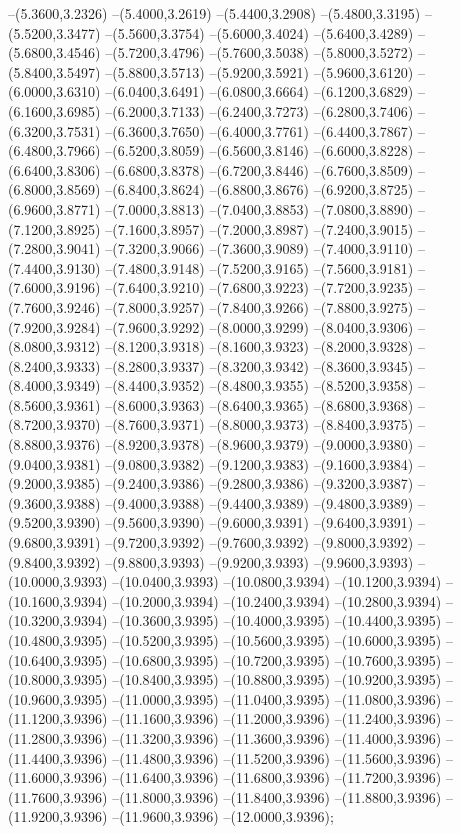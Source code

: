 {	--(5.3600,3.2326)
	--(5.4000,3.2619)
	--(5.4400,3.2908)
	--(5.4800,3.3195)
	--(5.5200,3.3477)
	--(5.5600,3.3754)
	--(5.6000,3.4024)
	--(5.6400,3.4289)
	--(5.6800,3.4546)
	--(5.7200,3.4796)
	--(5.7600,3.5038)
	--(5.8000,3.5272)
	--(5.8400,3.5497)
	--(5.8800,3.5713)
	--(5.9200,3.5921)
	--(5.9600,3.6120)
	--(6.0000,3.6310)
	--(6.0400,3.6491)
	--(6.0800,3.6664)
	--(6.1200,3.6829)
	--(6.1600,3.6985)
	--(6.2000,3.7133)
	--(6.2400,3.7273)
	--(6.2800,3.7406)
	--(6.3200,3.7531)
	--(6.3600,3.7650)
	--(6.4000,3.7761)
	--(6.4400,3.7867)
	--(6.4800,3.7966)
	--(6.5200,3.8059)
	--(6.5600,3.8146)
	--(6.6000,3.8228)
	--(6.6400,3.8306)
	--(6.6800,3.8378)
	--(6.7200,3.8446)
	--(6.7600,3.8509)
	--(6.8000,3.8569)
	--(6.8400,3.8624)
	--(6.8800,3.8676)
	--(6.9200,3.8725)
	--(6.9600,3.8771)
	--(7.0000,3.8813)
	--(7.0400,3.8853)
	--(7.0800,3.8890)
	--(7.1200,3.8925)
	--(7.1600,3.8957)
	--(7.2000,3.8987)
	--(7.2400,3.9015)
	--(7.2800,3.9041)
	--(7.3200,3.9066)
	--(7.3600,3.9089)
	--(7.4000,3.9110)
	--(7.4400,3.9130)
	--(7.4800,3.9148)
	--(7.5200,3.9165)
	--(7.5600,3.9181)
	--(7.6000,3.9196)
	--(7.6400,3.9210)
	--(7.6800,3.9223)
	--(7.7200,3.9235)
	--(7.7600,3.9246)
	--(7.8000,3.9257)
	--(7.8400,3.9266)
	--(7.8800,3.9275)
	--(7.9200,3.9284)
	--(7.9600,3.9292)
	--(8.0000,3.9299)
	--(8.0400,3.9306)
	--(8.0800,3.9312)
	--(8.1200,3.9318)
	--(8.1600,3.9323)
	--(8.2000,3.9328)
	--(8.2400,3.9333)
	--(8.2800,3.9337)
	--(8.3200,3.9342)
	--(8.3600,3.9345)
	--(8.4000,3.9349)
	--(8.4400,3.9352)
	--(8.4800,3.9355)
	--(8.5200,3.9358)
	--(8.5600,3.9361)
	--(8.6000,3.9363)
	--(8.6400,3.9365)
	--(8.6800,3.9368)
	--(8.7200,3.9370)
	--(8.7600,3.9371)
	--(8.8000,3.9373)
	--(8.8400,3.9375)
	--(8.8800,3.9376)
	--(8.9200,3.9378)
	--(8.9600,3.9379)
	--(9.0000,3.9380)
	--(9.0400,3.9381)
	--(9.0800,3.9382)
	--(9.1200,3.9383)
	--(9.1600,3.9384)
	--(9.2000,3.9385)
	--(9.2400,3.9386)
	--(9.2800,3.9386)
	--(9.3200,3.9387)
	--(9.3600,3.9388)
	--(9.4000,3.9388)
	--(9.4400,3.9389)
	--(9.4800,3.9389)
	--(9.5200,3.9390)
	--(9.5600,3.9390)
	--(9.6000,3.9391)
	--(9.6400,3.9391)
	--(9.6800,3.9391)
	--(9.7200,3.9392)
	--(9.7600,3.9392)
	--(9.8000,3.9392)
	--(9.8400,3.9392)
	--(9.8800,3.9393)
	--(9.9200,3.9393)
	--(9.9600,3.9393)
	--(10.0000,3.9393)
	--(10.0400,3.9393)
	--(10.0800,3.9394)
	--(10.1200,3.9394)
	--(10.1600,3.9394)
	--(10.2000,3.9394)
	--(10.2400,3.9394)
	--(10.2800,3.9394)
	--(10.3200,3.9394)
	--(10.3600,3.9395)
	--(10.4000,3.9395)
	--(10.4400,3.9395)
	--(10.4800,3.9395)
	--(10.5200,3.9395)
	--(10.5600,3.9395)
	--(10.6000,3.9395)
	--(10.6400,3.9395)
	--(10.6800,3.9395)
	--(10.7200,3.9395)
	--(10.7600,3.9395)
	--(10.8000,3.9395)
	--(10.8400,3.9395)
	--(10.8800,3.9395)
	--(10.9200,3.9395)
	--(10.9600,3.9395)
	--(11.0000,3.9395)
	--(11.0400,3.9395)
	--(11.0800,3.9396)
	--(11.1200,3.9396)
	--(11.1600,3.9396)
	--(11.2000,3.9396)
	--(11.2400,3.9396)
	--(11.2800,3.9396)
	--(11.3200,3.9396)
	--(11.3600,3.9396)
	--(11.4000,3.9396)
	--(11.4400,3.9396)
	--(11.4800,3.9396)
	--(11.5200,3.9396)
	--(11.5600,3.9396)
	--(11.6000,3.9396)
	--(11.6400,3.9396)
	--(11.6800,3.9396)
	--(11.7200,3.9396)
	--(11.7600,3.9396)
	--(11.8000,3.9396)
	--(11.8400,3.9396)
	--(11.8800,3.9396)
	--(11.9200,3.9396)
	--(11.9600,3.9396)
	--(12.0000,3.9396);
}
